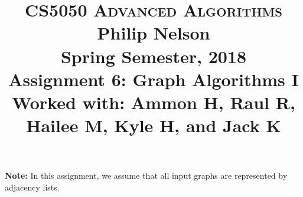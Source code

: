 \documentclass[11pt]{article}
\begin{document}
\baselineskip=14.0pt

\title{CS5050 \textsc{Advanced Algorithms}
\\ {\bf Philip Nelson}
\\ {\Large Spring Semester, 2018}
\\ Assignment 6: Graph Algorithms I
\\ {\large Worked with: Ammon H, Raul R, Hailee M, Kyle H, and Jack K}}
\date{}

\maketitle

\vspace{-0.6in}

{\bf Note:} In this assignment, we assume that all input graphs are represented by adjacency lists.
\end{document}
